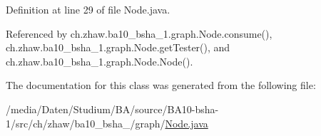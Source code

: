 Definition at line 29 of file Node.java.

Referenced by ch.zhaw.ba10\_\-bsha\_\-1.graph.Node.consume(), ch.zhaw.ba10\_\-bsha\_\-1.graph.Node.getTester(), and ch.zhaw.ba10\_\-bsha\_\-1.graph.Node.Node().

The documentation for this class was generated from the following file:\begin{DoxyCompactItemize}
\item 
/media/Daten/Studium/BA/source/BA10-\/bsha-\/1/src/ch/zhaw/ba10\_\-bsha\_/graph/\hyperlink{Node_8java}{Node.java}\end{DoxyCompactItemize}
